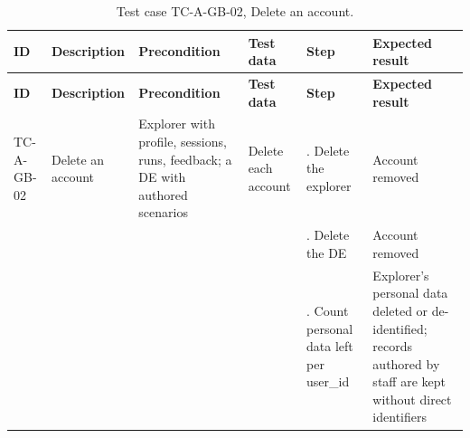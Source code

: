 {\footnotesize{}\renewcommand{\arraystretch}{1.1}
\begin{longtable}{|>{\raggedright\arraybackslash}p{}|>{\raggedright\arraybackslash}p{}|>{\raggedright\arraybackslash}p{}|>{\raggedright\arraybackslash}p{}|>{\raggedright\arraybackslash}p{}|>{\raggedright\arraybackslash}p{}|}
\caption{Test case TC-A-GB-02, Delete an account.} \\
\hline
\textbf{ID} & \textbf{Description} & \textbf{Precondition} & \textbf{Test data} & \textbf{Step} & \textbf{Expected result} \\ \hline
\endfirsthead
\hline
\textbf{ID} & \textbf{Description} & \textbf{Precondition} & \textbf{Test data} & \textbf{Step} & \textbf{Expected result} \\ \hline
\endhead
TC-A-GB-02 & Delete an account & Explorer with profile, sessions, runs, feedback; a DE with authored scenarios & Delete each account & 1. Delete the explorer & Account removed \\ \cline{5-6}
 &  &  &  & 2. Delete the DE & Account removed \\ \cline{5-6}
 &  &  &  & 3. Count personal data left per user\_id & Explorer's personal data deleted or de-\allowbreak{}identified; records authored by staff are kept without direct identifiers \\ \hline
\end{longtable}
}

